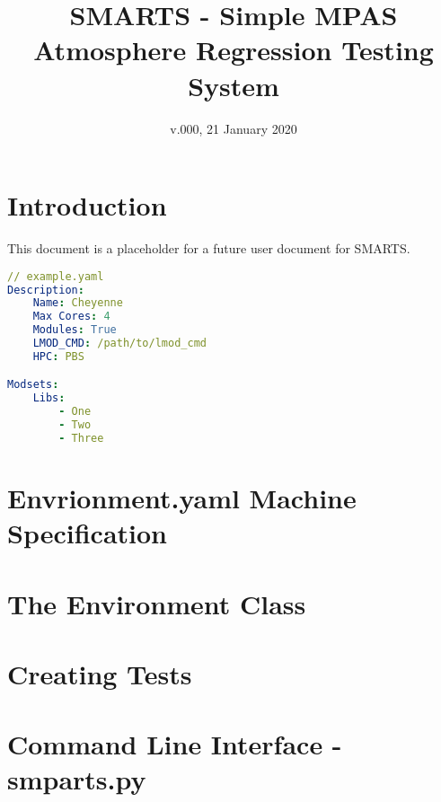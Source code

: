 \documentclass[11pt]{report}
\begin{document}
\title{SMARTS - Simple MPAS Atmosphere Regression Testing System}
\date{v.000, 21 January 2020}

\maketitle

\chapter{Introduction}
\label{chap:intro}

This document is a placeholder for a future user document for SMARTS.

\begin{lstlisting}[language=yaml]
// example.yaml
Description:
    Name: Cheyenne
    Max Cores: 4
    Modules: True
    LMOD_CMD: /path/to/lmod_cmd
    HPC: PBS

Modsets:
    Libs:
        - One
        - Two
        - Three
\end{lstlisting}


\chapter{Envrionment.yaml Machine Specification}

\chapter{The Environment Class}

\chapter{Creating Tests}

\chapter{Command Line Interface - smparts.py}
\end{document}
